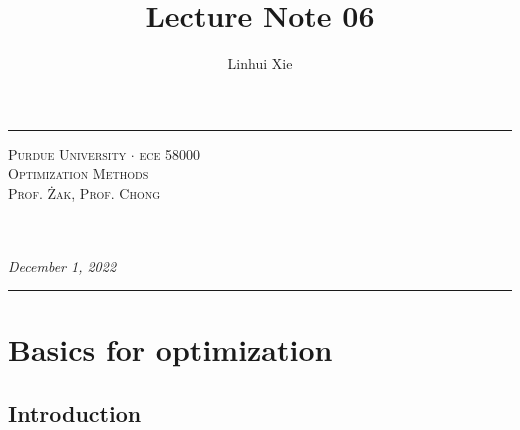 \documentclass[12pt,thmsa]{article}
\author{Linhui Xie}
\title{Lecture Note 06}
\makeatletter
\def\maketitle{%
	\par
	\hrule height 1.5pt\vspace{1ex}
	\par\noindent
	
	\begin{minipage}{0.5\textwidth}
		\scshape
		Purdue University $\cdot$ ece 58000 \\[1ex]
		Optimization Methods \\
		Prof. Żak, Prof. Chong
	\end{minipage}
	\begin{minipage}{0.45\textwidth}
		\raggedleft
		\MakeTextUppercase{{\@title}}\\[0.3ex] %
		\textit{\@author}\\[0.2ex]
		\textit{December 1, 2022}
	\end{minipage}
	\par\vspace{1ex}
	\hrule height 1.5pt\vspace{1ex}
	\par
}
\makeatother
\begin{document}
\maketitle
\setcounter{section}{5}
\section{Basics for optimization\medskip}
\setcounter{section}{6}


\subsection{Introduction}
\end{document}
